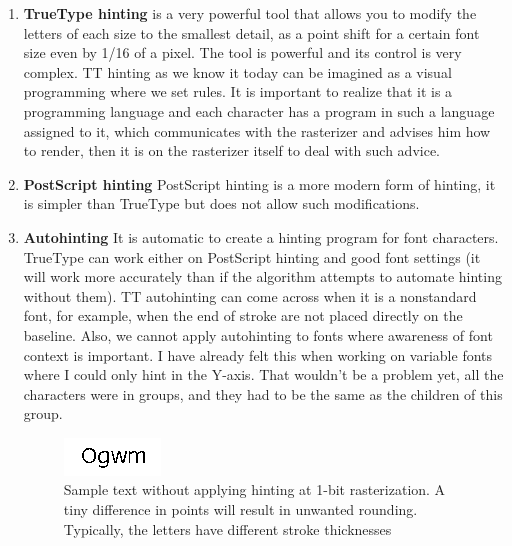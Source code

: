 \documentclass[a4paper]{article}
\begin{document}
\begin{enumerate}
\item \textbf{TrueType hinting}
is a very powerful tool that allows you to modify the letters of each size to the smallest detail, as a point shift for a certain font size even by 1/16 of a pixel. The tool is powerful and its control is very complex. TT hinting as we know it today can be imagined as a visual programming where we set rules. It is important to realize that it is a programming language and each character has a program in such a language assigned to it, which communicates with the rasterizer and advises him how to render, then it is on the rasterizer itself to deal with such advice.

\item \textbf{PostScript hinting}
PostScript hinting is a more modern form of hinting, it is simpler than TrueType but does not allow such modifications.

\item \textbf{Autohinting}
It is automatic to create a hinting program for font characters. TrueType can work either on PostScript hinting and good font settings (it will work more accurately than if the algorithm attempts to automate hinting without them). TT autohinting can come across when it is a nonstandard font, for example, when the end of stroke are not placed directly on the baseline. Also, we cannot apply autohinting to fonts where awareness of font context is important. I have already felt this when working on variable fonts where I could only hint in the Y-axis. That wouldn't be a problem yet, all the characters were in groups, and they had to be the same as the children of this group.

\begin{figure} [H]
  \includegraphics [width =\linewidth]{pics/no_hinting.png}
  \caption{Sample text without applying hinting at 1-bit rasterization. A tiny difference in points will result in unwanted rounding. Typically, the letters have different stroke thicknesses}
\end{figure}


\end{enumerate}
\end{document}
